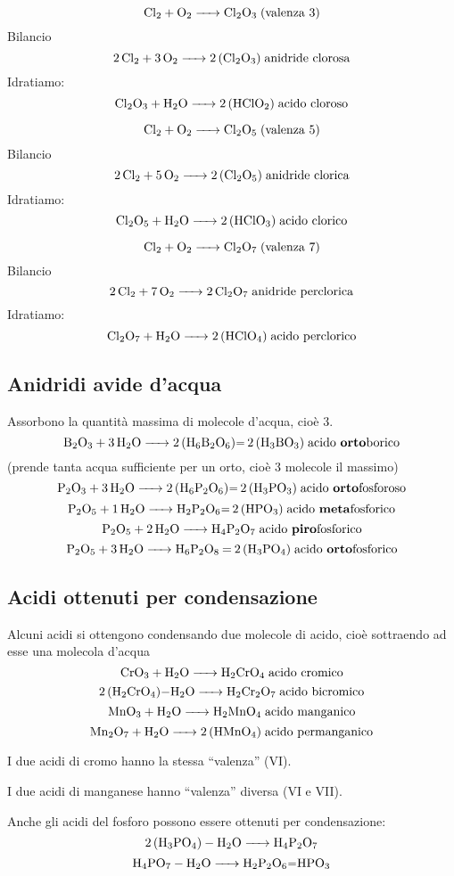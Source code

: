 $$\ce{Cl_2 + O_2 -> Cl_2O_3} \; \text{(valenza 3)}$$ Bilancio
$$\ce{2 Cl_2 + 3 O_2 -> 2 (Cl_2O_3)} \; \text{anidride clorosa}$$
Idratiamo:
$$\ce{Cl_2O_3 + H_2O -> 2 (HClO_2) } \; \text{acido cloroso}$$

$$\ce{Cl_2 + O_2 -> Cl_2O_5} \; \text{(valenza 5)}$$ Bilancio
$$\ce{2 Cl_2 + 5 O_2 -> 2 (Cl_2O_5)} \; \text{anidride clorica}$$
Idratiamo:
$$\ce{Cl_2O_5 + H_2O -> 2 (HClO_3)} \; \text{acido clorico}$$

$$\ce{Cl_2 + O_2 -> Cl_2O_7} \; \text{(valenza 7)}$$ Bilancio
$$\ce{2 Cl_2 + 7 O_2 -> 2 Cl_2O_7} \; \text{anidride perclorica}$$
Idratiamo:
$$\ce{Cl_2O_7 + H_2O -> 2 (HClO_4)} \; \text{acido perclorico}$$

\subsection{Anidridi avide d'acqua}
Assorbono la quantità massima di molecole d'acqua, cioè 3.
$$\ce{B_2O_3 + 3 H_2O -> 2 (H_6B_2O_6)= 2 (H_3BO_3)} \; \text{acido \textbf{orto}borico}$$\hspace{+1.2cm}(prende tanta acqua sufficiente per un orto, cioè 3 molecole il massimo)
$$\ce{P_2O_3 + 3  H_2O -> 2 (H_6P_2O_6)= 2 (H_3PO_3)} \; \text{acido \textbf{orto}fosforoso}$$
$$\ce{P_2O_5 + 1 H_2O -> H_2P_2O_6= 2 (HPO_3)} \; \text{acido \textbf{meta}fosforico}$$
$$\ce{P_2O_5 + 2 H_2O -> H_4P_2O_7} \; \text{acido \textbf{piro}fosforico}$$
$$\ce{P_2O_5 + 3 H_2O -> H_6P_2O_8 = 2 (H_3PO_4)} \; \text{acido \textbf{orto}fosforico}$$
\subsection{Acidi ottenuti per condensazione}
Alcuni acidi si ottengono condensando due molecole di acido, cioè sottraendo ad esse una molecola d'acqua
$$\ce{CrO_3 + H_2O -> H_2CrO_4} \; \text{acido cromico}$$
$$\ce{2 (H_2CrO_4)-H_2O -> H_2Cr_2O_7} \; \text{acido bicromico}$$
$$\ce{MnO_3 + H_2O -> H_2MnO_4} \; \text{acido manganico}$$
$$\ce{Mn_2O_7 + H_2O -> 2 (HMnO_4)} \; \text{acido permanganico}$$

I due acidi di cromo hanno la stessa “valenza” (VI).

I due acidi di manganese hanno “valenza” diversa (VI e VII).

Anche gli acidi del fosforo possono essere ottenuti per condensazione:
$$\ce{2 (H_3PO_4) - H_2O -> H_4P_2O_7}$$
$$\ce{H_4PO_7 - H_2O -> H_2P_2O_6=HPO_3}$$
